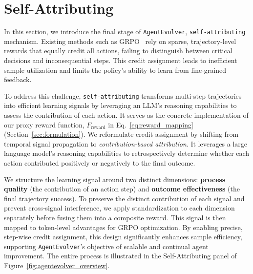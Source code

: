 \section{Self-Attributing}
\label{sec:self-attribution}

In this section, we introduce the final stage of \texttt{AgentEvolver}, \texttt{self-attributing} mechanism.
Existing methods such as GRPO~\citep{deepseek_math} rely on sparse, trajectory-level rewards that equally credit all actions, failing to distinguish between critical decisions and inconsequential steps. This  credit assignment leads to inefficient sample utilization and limits the policy's ability to learn from fine-grained feedback.

To address this challenge, \texttt{self-attributing} transforms multi-step trajectories into efficient learning signals by leveraging an LLM's reasoning capabilities to assess the contribution of each action. It serves as the concrete implementation of our proxy reward function, $F_\mathrm{reward}$ in Eq.~\ref{eq:reward_mapping} (Section~\ref{sec:formulation}). We reformulate credit assignment by shifting from temporal signal propagation to \emph{contribution-based attribution}. It leverages a large language model's reasoning capabilities to retrospectively determine whether each action contributed positively or negatively to the final outcome. 

We structure the learning signal around two distinct dimensions: \textbf{process quality} (the contribution of an action step) and \textbf{outcome effectiveness} (the final trajectory success). To preserve the distinct contribution of each signal and prevent cross-signal interference, we apply standardization to each dimension separately before fusing them into a composite reward. This signal is then mapped to token-level advantages for GRPO optimization. By enabling precise, step-wise credit assignment, this design significantly enhances sample efficiency, supporting \texttt{AgentEvolver}'s objective of scalable and continual agent improvement. The entire process is illustrated in the Self-Attributing panel of Figure~\ref{fig:agentevolver_overview}.



